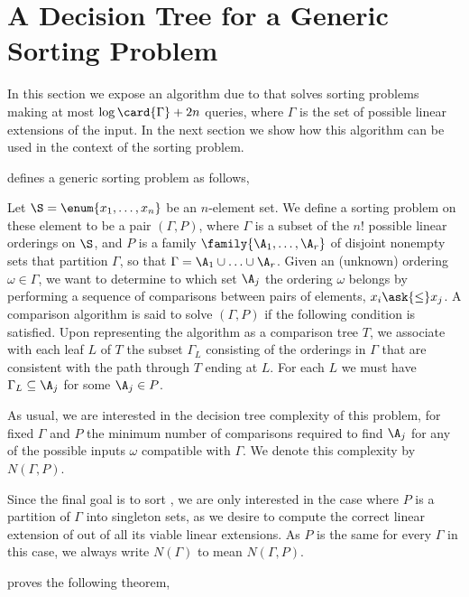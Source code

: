 \section{A Decision Tree for a Generic Sorting Problem}
\label{tree:xy:dt}

In this section we expose an algorithm due to \citet*{fredman:1976}
that solves sorting problems making at most $\log\card{\Gamma} + 2n$ queries,
where $\Gamma$ is the set of possible linear extensions of the input. In the
next section we show how this algorithm can be used in the context of the
sorting \XY problem.

\citet{fredman:1976} defines a generic sorting problem as follows,

\begin{problem}
Let $\S = \enum{x_1, \ldots, x_n}$ be an $n$-element set. We define a sorting
problem on these element to be a pair $(\Gamma, P)$, where $\Gamma$ is a
subset of the $n!$ possible linear orderings on $\S$, and
$P$ is a family $\family{\A_1, \ldots, \A_r}$ of disjoint nonempty sets that
partition $\Gamma$, so that $\Gamma = \A_1 \cup \ldots \cup \A_r$. Given an
(unknown) ordering $\omega \in \Gamma$, we want to determine to which set $\A_j$ the
ordering $\omega$ belongs by performing a sequence of comparisons between
pairs of elements, $x_i \ask{\le} x_j$. A comparison algorithm is said to
solve $(\Gamma, P)$ if the following condition is satisfied. Upon representing
the algorithm as a comparison tree $T$, we associate with each leaf $L$ of $T$
the subset $\Gamma_L$ consisting of the orderings in $\Gamma$ that are
consistent with the
path through $T$ ending at $L$. For each $L$ we must have $\Gamma_L \subseteq
\A_j$ for some $\A_j \in P$.
\end{problem}

As usual, we are interested in the decision tree complexity of this
problem, \ie for fixed \(\Gamma\) and \(P\) the minimum number of comparisons
required to find \(\A_j\) for any of the possible inputs \(\omega\) compatible
with \(\Gamma\). We denote this complexity by $N(\Gamma, P)$.

Since the final goal is to sort \XY, we are only interested in the case
where $P$ is a partition of $\Gamma$ into singleton sets, as we desire to
compute the correct linear extension of \XY out of all its viable linear
extensions. As $P$ is the same for every $\Gamma$ in this case, we
always write $N(\Gamma)$ to mean $N(\Gamma, P)$.

\citet{fredman:1976} proves the following theorem,

